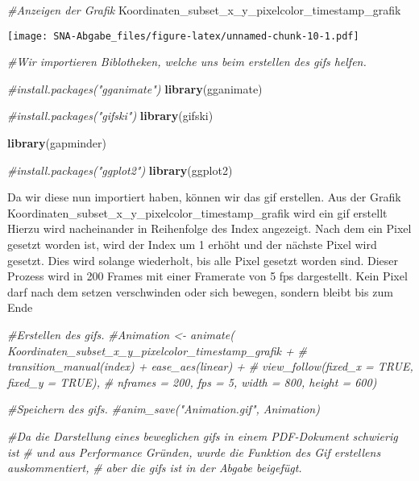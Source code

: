 \documentclass[
]{article}
\newenvironment{Shaded}{\begin{snugshade}}{\end{snugshade}}
\newcommand{\CommentTok}[1]{\textcolor[rgb]{0.56,0.35,0.01}{\textit{#1}}}
\newcommand{\FunctionTok}[1]{\textcolor[rgb]{0.13,0.29,0.53}{\textbf{#1}}}
\newcommand{\NormalTok}[1]{#1}
\begin{document}
\begin{Shaded}
\begin{Highlighting}[]
\CommentTok{\#Anzeigen der Grafik}
\NormalTok{Koordinaten\_subset\_x\_y\_pixelcolor\_timestamp\_grafik}
\end{Highlighting}
\end{Shaded}

\texttt{[image: SNA-Abgabe\_files/figure-latex/unnamed-chunk-10-1.pdf]}

\begin{Shaded}
\begin{Highlighting}[]
\CommentTok{\#Wir importieren Biblotheken, welche uns beim erstellen des gifs helfen.}

\CommentTok{\#install.packages("gganimate")}
\FunctionTok{library}\NormalTok{(gganimate)}

\CommentTok{\#install.packages("gifski")}
\FunctionTok{library}\NormalTok{(gifski)}

\FunctionTok{library}\NormalTok{(gapminder)}

\CommentTok{\#install.packages("ggplot2")}
\FunctionTok{library}\NormalTok{(ggplot2)}
\end{Highlighting}
\end{Shaded}

Da wir diese nun importiert haben, können wir das gif erstellen. Aus der
Grafik Koordinaten\_subset\_x\_y\_pixelcolor\_timestamp\_grafik wird ein
gif erstellt Hierzu wird nacheinander in Reihenfolge des Index
angezeigt. Nach dem ein Pixel gesetzt worden ist, wird der Index um 1
erhöht und der nächste Pixel wird gesetzt. Dies wird solange wiederholt,
bis alle Pixel gesetzt worden sind. Dieser Prozess wird in 200 Frames
mit einer Framerate von 5 fps dargestellt. Kein Pixel darf nach dem
setzen verschwinden oder sich bewegen, sondern bleibt bis zum Ende

\begin{Shaded}
\begin{Highlighting}[]
\CommentTok{\#Erstellen des gifs.}
\CommentTok{\#Animation \textless{}{-} animate(  Koordinaten\_subset\_x\_y\_pixelcolor\_timestamp\_grafik +}
\CommentTok{\#    transition\_manual(index) + ease\_aes(\textquotesingle{}linear\textquotesingle{}) + }
\CommentTok{\#     view\_follow(fixed\_x = TRUE, fixed\_y = TRUE),}
\CommentTok{\#  nframes = 200, fps = 5, width = 800, height = 600)}


\CommentTok{\#Speichern des gifs.}
\CommentTok{\#anim\_save("Animation.gif", Animation)}

\CommentTok{\#Da die Darstellung eines beweglichen gifs in einem PDF{-}Dokument schwierig ist}
\CommentTok{\# und aus Performance Gründen, wurde die Funktion des Gif erstellens auskommentiert,}
\CommentTok{\# aber die gifs ist in der Abgabe beigefügt.}
\end{Highlighting}
\end{Shaded}
\end{document}
